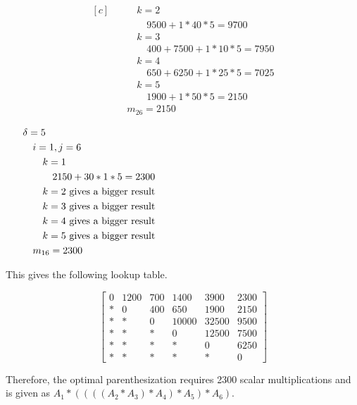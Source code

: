 \documentclass[a4paper]{article}
\begin{document}
\begin{enumerate}
\begin{equation*}
\begin{aligned}[c]
      &\quad \quad k=2 \\
      &\quad \quad \quad 9500+1*40*5=9700 \\
      &\quad \quad k=3 \\
      &\quad \quad \quad 400+7500+1*10*5=7950 \\
      &\quad \quad k=4 \\
      &\quad \quad \quad 650+6250+1*25*5=7025 \\
      &\quad \quad k=5 \\
      &\quad \quad \quad 1900+1*50*5=2150 \\
      &\quad m_{26}=2150
    \end{aligned}
  \end{equation*}

  \begin{equation*}
    \begin{aligned}[c]
      &\delta=5 \\
      &\quad i=1, j=6 \\
      &\quad \quad k=1 \\
      &\quad \quad \quad 2150 + 30*1*5=2300 \\
      &\quad \quad k=2 \text{ gives a bigger result} \\
      &\quad \quad k=3 \text{ gives a bigger result} \\
      &\quad \quad k=4 \text{ gives a bigger result} \\
      &\quad \quad k=5 \text{ gives a bigger result} \\
      &\quad m_{16} = 2300
    \end{aligned}
    \hspace{6.7cm}
  \end{equation*}

  This gives the following lookup table.

    \[
    \begin{bmatrix}

      0 & 1200 & 700 & 1400 & 3900 & 2300 \\
      * & 0 & 400 & 650 & 1900 & 2150 \\
      * & * & 0 & 10000 & 32500 & 9500 \\
      * & * & * & 0 & 12500 & 7500 \\
      * & * & * & * & 0 & 6250 \\
      * & * & * & * & * & 0

    \end{bmatrix}
    \]

    Therefore, the optimal parenthesization requires 2300 scalar multiplications and is given as $A_1 * ((( (A_2 * A_3) * A_4) * A_5) * A_6)$.


\end{enumerate}
\end{document}
